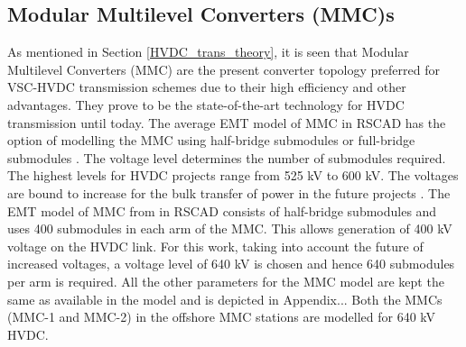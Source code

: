 \subsection{Modular Multilevel Converters (MMC)s}
As mentioned in Section \ref{HVDC_trans_theory}, it is seen that Modular Multilevel Converters (\gls{MMC}) are the present converter topology preferred for \gls{VSC}-\gls{HVDC} transmission schemes due to their high efficiency and other advantages. They prove to be the state-of-the-art technology for \gls{HVDC} transmission until today. The average \gls{EMT} model of \gls{MMC} in
RSCAD has the option of modelling the \gls{MMC} using half-bridge submodules or full-bridge submodules \cite{noauthor_mmc_nodate}. The voltage level determines the number of submodules required. The highest levels for \gls{HVDC} projects range from 525 kV to 600 kV. The voltages are bound to increase for the bulk transfer of power in the future projects \cite{lagrotteria_hvdc_2019}. The \gls{EMT} model of \gls{MMC} from \cite{vrana2013cigre} in RSCAD consists of half-bridge submodules and uses 400 submodules in each arm of the \gls{MMC}. This allows generation of 400 kV voltage on the \gls{HVDC} link. For this work, taking into account the future of increased voltages, a voltage level of 640 kV is chosen and hence 640 submodules per arm is required. All the other parameters for the \gls{MMC} model are kept the same as available in the \cite{vrana2013cigre} model and is depicted in Appendix... Both the \gls{MMC}s (\gls{MMC}-1 and \gls{MMC}-2) in the offshore \gls{MMC} stations are modelled for 640 kV \gls{HVDC}.  


